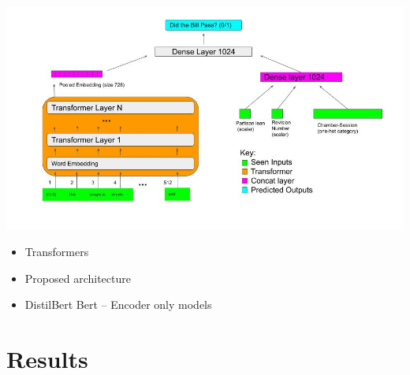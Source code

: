 \documentclass[11pt]{article}
\begin{document}

\includegraphics[width=150mm]{figures/network_architecture.jpg}


\begin{itemize}
  \item Transformers
  \item Proposed architecture
  \item DistilBert Bert  -- Encoder only models
\end{itemize}



\section{Results}
\end{document}

